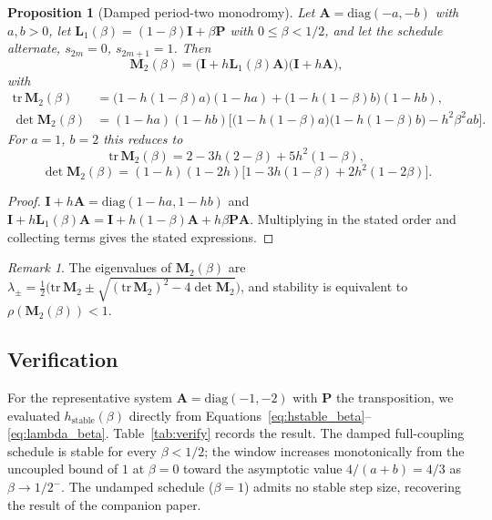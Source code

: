 \documentclass[12pt, a4paper]{article}
\theoremstyle{plain}
\newtheorem{proposition}{Proposition}
\theoremstyle{definition}
\theoremstyle{remark}
\newtheorem{remark}{Remark}
\newcommand{\bI}{\mathbf{I}}
\newcommand{\bP}{\mathbf{P}}
\newcommand{\bA}{\mathbf{A}}
\newcommand{\bM}{\mathbf{M}}
\newcommand{\bL}{\mathbf{L}}
\begin{document}
\begin{proposition}[Damped period-two monodromy]
\label{prop:alternating}
Let $\bA = \mathrm{diag}(-a,-b)$ with $a,b>0$, let
$\bL_1(\beta) = (1-\beta)\bI + \beta\bP$ with $0 \le \beta < 1/2$, and let the
schedule alternate, $s_{2m}=0$, $s_{2m+1}=1$. Then
\begin{equation}
\bM_2(\beta) = \big(\bI + h\bL_1(\beta)\bA\big)\big(\bI + h\bA\big),
\end{equation}
with
\begin{equation}
\begin{aligned}
\mathrm{tr}\,\bM_2(\beta)
&= \big(1 - h(1-\beta)a\big)(1 - ha)
+ \big(1 - h(1-\beta)b\big)(1 - hb), \\[2pt]
\det \bM_2(\beta)
&= (1-ha)(1-hb)\Big[\big(1 - h(1-\beta)a\big)\big(1 - h(1-\beta)b\big)
- h^2\beta^2 ab\Big].
\end{aligned}
\label{eq:M2invariants}
\end{equation}
For $a=1$, $b=2$ this reduces to
\begin{equation}
\mathrm{tr}\,\bM_2(\beta) = 2 - 3h(2-\beta) + 5h^2(1-\beta),
\end{equation}
\begin{equation}
\det \bM_2(\beta) = (1-h)(1-2h)\big[1 - 3h(1-\beta) + 2h^2(1-2\beta)\big].
\end{equation}
\end{proposition}

\begin{proof}
$\bI + h\bA = \mathrm{diag}(1-ha, 1-hb)$ and
$\bI + h\bL_1(\beta)\bA = \bI + h(1-\beta)\bA + h\beta\bP\bA$. Multiplying
in the stated order and collecting terms gives the stated expressions.
\end{proof}

\begin{remark}
The eigenvalues of $\bM_2(\beta)$ are
$\lambda_\pm = \tfrac{1}{2}\big(\mathrm{tr}\,\bM_2 \pm
\sqrt{(\mathrm{tr}\,\bM_2)^2 - 4\det\bM_2}\big)$, and stability is equivalent
to $\rho(\bM_2(\beta)) < 1$.
\end{remark}

\subsection{Verification}
\label{sec:verify}

For the representative system $\bA = \mathrm{diag}(-1,-2)$ with $\bP$ the
transposition, we evaluated $h_{\mathrm{stable}}(\beta)$ directly from
Equations~\eqref{eq:hstable_beta}--\eqref{eq:lambda_beta}.
Table~\ref{tab:verify} records the result. The damped full-coupling schedule
is stable for every $\beta < 1/2$; the window increases monotonically from the
uncoupled bound of $1$ at $\beta = 0$ toward the asymptotic value
$4/(a+b) = 4/3$ as $\beta \to 1/2^-$. The undamped schedule ($\beta = 1$)
admits no stable step size, recovering the result of the companion paper.
\end{document}

